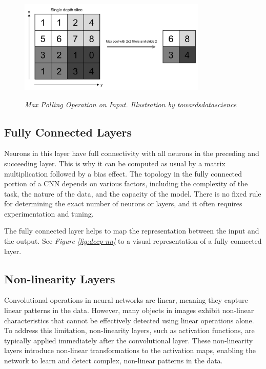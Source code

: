 \begin{figure}[H]
  \centering
  \includegraphics[width=0.8\textwidth]{imatges/preliminaries/polling-layer.png}
  \caption[Max Polling Operation on Input]{\textit{Max Polling Operation on Input. Illustration by towardsdatascience}}
  {\label{fig:pooling-layer}}
\end{figure}

\subsection{Fully Connected Layers}

Neurons in this layer have full connectivity with all neurons in the preceding
and succeeding layer. This is why it can be computed as usual by a matrix
multiplication followed by a bias effect. The topology in the fully connected
portion of a CNN depends on various factors, including the complexity of the
task, the nature of the data, and the capacity of the model. There is no fixed
rule for determining the exact number of neurons or layers, and it often
requires experimentation and tuning. \newline

The fully connected layer helps to map the representation between the input and
the output. See \textit{Figure \ref{fig:deep-nn}} to a visual representation of
a fully connected layer. \newline

\subsection{Non-linearity Layers}

Convolutional operations in neural networks are linear, meaning they capture
linear patterns in the data. However, many objects in images exhibit non-linear
characteristics that cannot be effectively detected using linear operations
alone. To address this limitation, non-linearity layers, such as activation
functions, are typically applied immediately after the convolutional layer.
These non-linearity layers introduce non-linear transformations to the
activation maps, enabling the network to learn and detect complex, non-linear
patterns in the data. \newline

